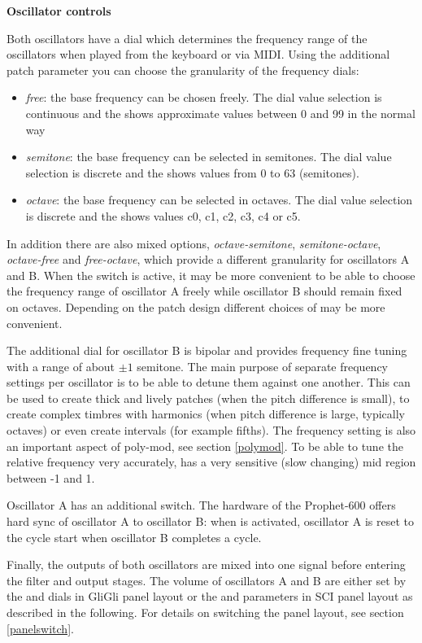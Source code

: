 \textbf{Oscillator controls}

Both oscillators have a \oscfreq dial which determines the frequency range of the oscillators when played from the keyboard or via MIDI. Using the additional patch parameter \oscpitchmode you can choose the granularity of the frequency dials: 
\begin{itemize}
  \item \textit{free}: the base frequency can be chosen freely. The dial value selection is continuous and the \display shows approximate values between 0 and 99 in the normal way
  \item \textit{semitone}: the base frequency can be selected in semitones. The dial value selection is discrete and the \display shows values from 0 to 63 (semitones).   
  \item \textit{octave}: the base frequency can be selected in octaves. The dial value selection is discrete and the \display shows values c0, c1, c2, c3, c4 or c5. 
\end{itemize}  
In addition there are also mixed options, \textit{octave-semitone}, \textit{semitone-octave}, \textit{octave-free} and \textit{free-octave}, which provide a different granularity for oscillators A and B. When the \oscsync switch is active, it may be more convenient to be able to choose the frequency range of oscillator A freely while oscillator B should remain fixed on octaves. Depending on the patch design different choices of \oscpitchmode may be more convenient. 

The additional \freqfine dial for oscillator B is bipolar and provides frequency fine tuning with a range of about $\pm 1$ semitone. The main purpose of separate frequency settings per oscillator is to be able to detune them against one another. This can be used to create thick and lively patches (when the pitch difference is small), to create complex timbres with harmonics (when pitch difference is large, typically octaves) or even create intervals (for example fifths). The frequency setting is also an important aspect of poly-mod, see section \ref{polymod}. To be able to tune the relative frequency very accurately, \freqfine has a very sensitive (slow changing) mid region between -1 and 1.

Oscillator A has an additional \oscsync switch. The hardware of the Prophet-600 offers hard sync of oscillator A to oscillator B: when \oscsync is activated, oscillator A is reset to the cycle start when oscillator B completes a cycle. 

Finally, the outputs of both oscillators are mixed into one signal before entering the filter and output stages. The volume of oscillators A and B are either set by the \vola and \volb dials in GliGli panel layout or the \mixer and \drive parameters in SCI panel layout as described in the following. For details on switching the panel layout, see section \ref{panelswitch}.

